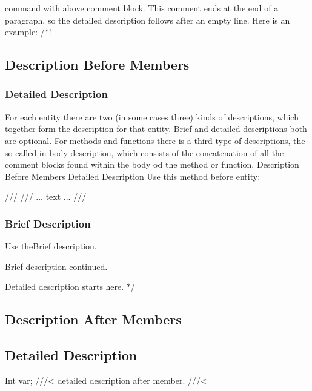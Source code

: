 command with above comment block. This comment ends at the end of a paragraph, so the detailed description follows after an empty line. Here is an example\+: /$\ast$!

\subsection*{Description Before Members}

\subsubsection*{Detailed Description}

For each entity there are two (in some cases three) kinds of descriptions, which together form the description for that entity. Brief and detailed descriptions both are optional. For methods and functions there is a third type of descriptions, the so called in body description, which consists of the concatenation of all the comment blocks found within the body od the method or function. Description Before Members Detailed Description Use this method before entity\+: \begin{DoxyVerb}    ///
    /// ... text ...
    /// 
\end{DoxyVerb}


\subsubsection*{Brief Description}

Use the\+Brief description.
\begin{DoxyItemize}
\item Brief description continued.
\item 
\item Detailed description starts here. $\ast$/
\end{DoxyItemize}

\subsection*{Description After Members}

\subsection*{Detailed Description}

\begin{DoxyVerb}Int var;    ///< detailed description after member.
        ///<
\end{DoxyVerb}


